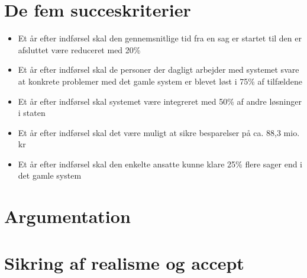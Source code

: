 \documentclass[10pt,a4paper,danish]{article}
\title{}
\author{Søren Pilgård, 190689, vpb984\\
Caroline Miller, 04071979, twq135\\
Rene}
\begin{document}
\maketitle
\newpage

\tableofcontents
\newpage

\section{De fem succeskriterier}

\begin{itemize}
\item Et år efter indførsel skal den gennemsnitlige tid fra en sag er startet til den er afsluttet være reduceret med 20\%
\item Et år efter indførsel skal de personer der dagligt arbejder med systemet svare at konkrete problemer med det gamle system er blevet løst i 75\% af tilfældene
\item Et år efter indførsel skal systemet være integreret med 50\% af andre løsninger i staten
\item Et år efter indførsel skal det være muligt at sikre besparelser på ca. 88,3 mio. kr
\item Et år efter indførsel skal den enkelte ansatte kunne klare 25\% flere sager end i det gamle system
\end{itemize}

\section{Argumentation}



\section{Sikring af realisme og accept}
\end{document}
